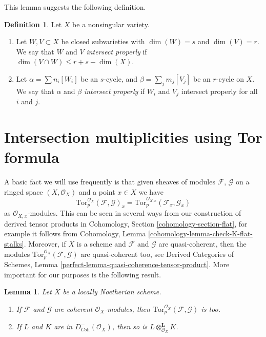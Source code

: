 \documentclass{stacks-project}
\theoremstyle{plain}
\newtheorem{lemma}[subsection]{Lemma}
\theoremstyle{definition}
\newtheorem{definition}[subsection]{Definition}
\theoremstyle{remark}
\numberwithin{equation}{subsection}
\begin{document}
\noindent
This lemma suggests the following definition.

\begin{definition}
\label{definition-proper-intersection}
Let $X$ be a nonsingular variety.
\begin{enumerate}
\item Let $W,V \subset X$ be closed subvarieties with
$\dim(W) = s$ and $\dim(V) = r$. We say that $W$ and $V$
{\it intersect properly} if $\dim(V \cap W) \leq r + s - \dim(X)$.
\item Let $\alpha = \sum n_i [W_i]$ be an $s$-cycle,
and $\beta = \sum_j m_j [V_j]$ be an $r$-cycle on $X$. We say
that $\alpha$ and $\beta$ {\it intersect properly} if
$W_i$ and $V_j$ intersect properly for all $i$ and $j$.
\end{enumerate}
\end{definition}


\section{Intersection multiplicities using Tor formula}
\label{section-tor-formula}

\noindent
A basic fact we will use frequently is that given sheaves of
modules $\mathcal{F}$, $\mathcal{G}$ on a ringed space $(X, \mathcal{O}_X)$
and a point $x \in X$ we have
$$
\text{Tor}_p^{\mathcal{O}_X}(\mathcal{F}, \mathcal{G})_x =
\text{Tor}_p^{\mathcal{O}_{X, x}}(\mathcal{F}_x, \mathcal{G}_x)
$$
as $\mathcal{O}_{X, x}$-modules. This can be seen in several ways
from our construction of derived tensor products in
Cohomology, Section \ref{cohomology-section-flat}, for example it follows from
Cohomology, Lemma \ref{cohomology-lemma-check-K-flat-stalks}.
Moreover, if $X$ is a scheme and $\mathcal{F}$ and $\mathcal{G}$
are quasi-coherent, then the modules
$\text{Tor}_p^{\mathcal{O}_X}(\mathcal{F}, \mathcal{G})$ are
quasi-coherent too, see
Derived Categories of Schemes, Lemma
\ref{perfect-lemma-quasi-coherence-tensor-product}.
More important for our purposes is the following result.

\begin{lemma}
\label{lemma-tensor-coherent}
Let $X$ be a locally Noetherian scheme.
\begin{enumerate}
\item If $\mathcal{F}$ and $\mathcal{G}$ are coherent $\mathcal{O}_X$-modules,
then $\text{Tor}_p^{\mathcal{O}_X}(\mathcal{F}, \mathcal{G})$ is too.
\item If $L$ and $K$ are in $D^-_{\textit{Coh}}(\mathcal{O}_X)$, then
so is $L \otimes_{\mathcal{O}_X}^\mathbf{L} K$.
\end{enumerate}
\end{lemma}
\end{document}
